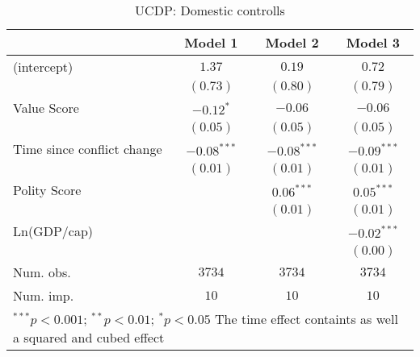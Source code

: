 
\begin{table}
\begin{center}
\begin{tabular}{l c c c}
\toprule
 & Model 1 & Model 2 & Model 3 \\
\midrule
(intercept)                & $1.37$        & $0.19$        & $0.72$        \\
                           & $(0.73)$      & $(0.80)$      & $(0.79)$      \\
Value Score                & $-0.12^{*}$   & $-0.06$       & $-0.06$       \\
                           & $(0.05)$      & $(0.05)$      & $(0.05)$      \\
Time since conflict change & $-0.08^{***}$ & $-0.08^{***}$ & $-0.09^{***}$ \\
                           & $(0.01)$      & $(0.01)$      & $(0.01)$      \\
Polity Score               &               & $0.06^{***}$  & $0.05^{***}$  \\
                           &               & $(0.01)$      & $(0.01)$      \\
Ln(GDP/cap)                &               &               & $-0.02^{***}$ \\
                           &               &               & $(0.00)$      \\
\midrule
Num. obs.                  & $3734$        & $3734$        & $3734$        \\
Num. imp.                  & $10$          & $10$          & $10$          \\
\bottomrule
\multicolumn{4}{l}{\scriptsize{$^{***}p<0.001$; $^{**}p<0.01$; $^{*}p<0.05$ 
 The time effect containts as well a squared and cubed effect}}
\end{tabular}
\caption{UCDP: Domestic controlls}
\label{UCDP_1}
\end{center}
\end{table}
